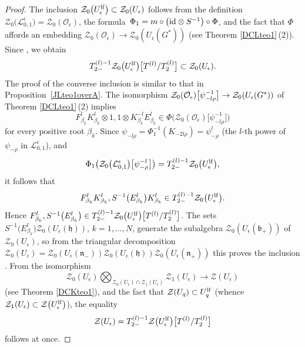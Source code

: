 \documentclass[pdftex]{sigma}
\numberwithin{equation}{section}
\theoremstyle{definition}
\newcommand{\e}{\epsilon}
\newcommand{\Ll}{{\mathcal L}}
\newcommand{\Oo}{{\mathcal O}}
\newcommand{\ra}{\rightarrow}
\begin{document}
\begin{proof}
The inclusion $\mathcal{Z}_0\big(U_\e^{\rm lf}\big) \subset \mathcal{Z}_0(U_\e)$ follows from the definition $\mathcal{Z}_0\bigl(\Ll_{0,1}^\e\bigr) = \mathcal{Z}_0(\Oo_\e)$, the formula~${\Phi_1 = m\circ \big({\rm id} \otimes S^{-1}\big)\circ \Phi}$, and the fact that $\Phi$ affords an embedding $\mathcal{Z}_0(\Oo_\e)\ra \mathcal{Z}_0(U_\e(G^*))$ (see Theorem \ref{DCLteo1}\,(2)). Since \smash{$T^{(l)}\subset \mathcal{Z}_0(U_\e)$}, we obtain
\[
T_{2-}^{(l)-1}\mathcal{Z}_0\big(U_\e^{\rm lf}\big)\big[T^{(l)}/T_{2}^{(l)}\big]\subset \mathcal{Z}_0(U_\e).
\]
 The proof of the converse inclusion is similar to that in Proposition~\ref{JLteo1overA}. The isomorphism $\smash{\mathcal{Z}_0(\Oo_\e)\big[\psi_{-l\rho}^{-1}\big]}\ra \mathcal{Z}_0(U_\e(G^*))$ of Theorem \ref{DCLteo1}\,(2) implies
\[
F_{\beta_k}^lK_{\beta_k}^l\otimes 1, 1\otimes K_{\beta_k}^{-l}E_{\beta_k}^l\in \Phi\big(\mathcal{Z}_0(\Oo_\e)\big[\psi_{-l\rho}^{-1}\big]\big)
\]
 for every positive root $\beta_k$. Since $\psi_{-l\rho} = \Phi_1^{-1}(K_{-2l\rho})=\psi_{-\rho}^l$ (the $l$-th power of $\psi_{-\rho}$ in $\Ll_{0,1}^\e$), and \[
 \Phi_1\big(\mathcal{Z}_0\bigl(\Ll_{0,1}^\e\bigr)\big[\psi_{-\rho}^{-l}\big]\big) = T_{2-}^{(l)-1}\mathcal{Z}_0\big(U_\e^{\rm lf}\big),
 \] it follows that
\[
F_{\beta_k}^lK_{\beta_k}^l, S^{-1}\bigl(E_{\beta_k}^l\bigr) K_{\beta_k}^l\in T_{2-}^{(l)-1}\mathcal{Z}_0\big(U_\e^{\rm lf}\big).
\]
 Hence $F_{\beta_k}^l, S^{-1}\big(E_{\beta_k}^l\big)\in T_{2-}^{(l)-1}\mathcal{Z}_0\big(U_\e^{\rm lf}\big)\big[T^{(l)}/T_{2}^{(l)}\big]$. The sets $S^{-1}\big(E_{\beta_k}^l\big)\mathcal{Z}_0(U_\e(\mathfrak{h}))$, $k=1,\dots,N$, generate the subalgebra $\mathcal{Z}_0(U_\e(\mathfrak{b}_+))$ of $\mathcal{Z}_0(U_\e)$, so from the triangular decomposition $\mathcal{Z}_0(U_\e)=\mathcal{Z}_0(U_\e(\mathfrak{n}_-))\mathcal{Z}_0(U_\e(\mathfrak{h}))\mathcal{Z}_0(U_\e(\mathfrak{n}_+))$ this proves the inclusion \smash{$\mathcal{Z}_0(U_\e)\subset T_{2-}^{(l) -1}\mathcal{Z}_0\big(U_\e^{\rm lf}\big)\big[T^{(l)}/T_{2}^{(l)}\big]$}.
 From the isomorphism
 \[
 \mathcal{Z}_0(U_\e)\bigotimes_{\mathcal{Z}_0(U_\e)\cap \mathcal{Z}_1(U_\e)} \mathcal{Z}_1(U_\e) \ra \mathcal{Z}(U_\e)
 \]
 (see Theorem \ref{DCKteo1}), and the fact that $\mathcal{Z}(U_q) \subset U_q^{\rm lf}$ \big(whence $\mathcal{Z}_1(U_\e)\subset \mathcal{Z}\big(U_\e^{\rm lf}\big)$\big), the equality \[\mathcal{Z}(U_\e) = T_{2-}^{(l)-1}\mathcal{Z}\big(U_\e^{\rm lf}\big)\big[T^{(l)}/T_{2}^{(l)}\big]\] follows at once.
 \end{proof}
\end{document}
